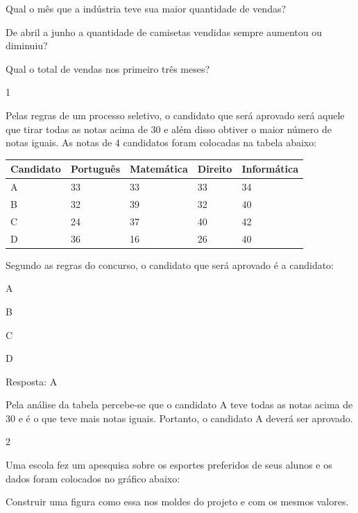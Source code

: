\begin{escolha}
\begin{escolha}
\begin{escolha}
\item
  Qual o mês que a indústria teve sua maior quantidade de vendas?

\item
  De abril a junho a quantidade de camisetas vendidas sempre aumentou ou
  diminuiu?

\item
  Qual o total de vendas nos primeiro três meses?
\end{escolha}


\num{1}

Pelas regras de um processo seletivo, o candidato que será aprovado será
aquele que tirar todas as notas acima de 30 e além disso obtiver o maior
número de notas iguais. As notas de 4 candidatos foram colocadas na
tabela abaixo:

\begin{longtable}[]{@{}lllll@{}}
\toprule
Candidato & Português & Matemática & Direito &
Informática\tabularnewline
\midrule
\endhead
A & 33 & 33 & 33 & 34\tabularnewline
B & 32 & 39 & 32 & 40\tabularnewline
C & 24 & 37 & 40 & 42\tabularnewline
D & 36 & 16 & 26 & 40\tabularnewline
\bottomrule
\end{longtable}

Segundo as regras do concurso, o candidato que será aprovado é a
candidato:

\begin{escolha}
\item
  A
\item
  B
\item
  C
\item
  D
\end{escolha}

Resposta: A

Pela análise da tabela percebe-se que o candidato A teve todas as notas
acima de 30 e é o que teve mais notas iguais. Portanto, o candidato A
deverá ser aprovado.

\num{2}

Uma escola fez um apesquisa sobre os esportes preferidos de seus alunos
e os dados foram colocados no gráfico abaixo:

Construir uma figura como essa nos moldes do projeto e com os mesmos
valores.


\end{escolha}
\end{escolha}
